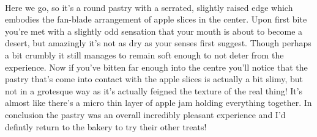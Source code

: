 \documentclass[]{article}
\begin{document}
\paragraph{} Here we go, so it's a round pastry with a serrated, slightly raised edge which embodies the fan-blade arrangement of apple slices in the center. Upon first bite you're met with a slightly odd sensation that your mouth is about to become a desert, but amazingly it's not as dry as your senses first suggest. Though perhaps a bit crumbly it still manages to remain soft enough to not deter from the experience. Now if you've bitten far enough into the centre you'll notice that the pastry that's come into contact with the apple slices is actually a bit slimy, but not in a grotesque way as it's actually feigned the texture of the real thing! It's almost like there's a micro thin layer of apple jam holding everything together. In conclusion the pastry was an overall incredibly pleasant experience and I'd defintly return to the bakery to try their other treats!

\newpage


\end{document}
